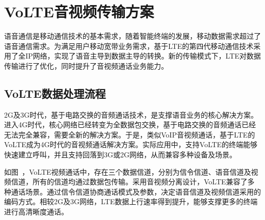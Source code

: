 \section{VoLTE音视频传输方案}
\label{chap:backinfo:volte}



语音通信是移动通信技术的基本需求，随着智能终端的发展，移动数据需求超过了语音通信需求。为满足用户移动宽带业务需求，基于LTE的第四代移动通信技术采用了全IP网络，实现了语音主导到数据主导的转换。新的传输模式下，LTE对数据传输进行了优化，同时提升了音视频通话业务能力。

\subsection{VoLTE数据处理流程}
\label{chap:backinfo:volte:datastream}

2G及3G时代，基于电路交换的音频通话技术，是支撑语音业务的核心解决方案。进入4G时代，核心网络已经转变为全数据包交换，基于电路交换的音频通话已经无法完全兼容，需要全新的解决方案。于是，类似VoIP音视频通话，基于LTE的VoLTE成为4G时代的音视频通话解决方案。实际应用中，支持VoLTE的终端能够快速建立呼叫，并且支持回落到3G或2G网络，从而兼容多种设备及场景。

如图\ ，VoLTE视频通话中，存在三个数据信道，分别为信令信道、语音信道及视频信道，所有的信道均通过数据包传输。采用音视频分离设计，VoLTE兼容了多种通话场景。通过信令信道协商通话模式及参数，决定语音信道及视频信道采用的编码方式。相较2G及3G网络，LTE数据上行速率得到提升，能够支撑更多的终端进行高清晰度通话。

